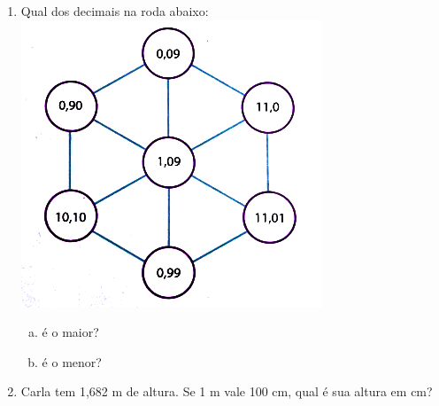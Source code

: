 \documentclass[a4paper,14pt]{article}
\begin{document}
\begin{multicols}{2}
\begin{enumerate}
        	\item Qual dos decimais na roda abaixo:\\
        	\includegraphics[width=1\linewidth]{6FMA55_imagens/imagem7}
        	\begin{enumerate}[a)]
        		\item é o maior?
        		\item é o menor?
        	\end{enumerate}
        	\item Carla tem 1,682 m de altura. Se 1 m vale 100 cm, qual é sua altura em cm?
        \end{enumerate}
    $~$ \\ $~$ \\ $~$ \\ $~$ \\ $~$ \\
    \end{multicols}
\end{document}
